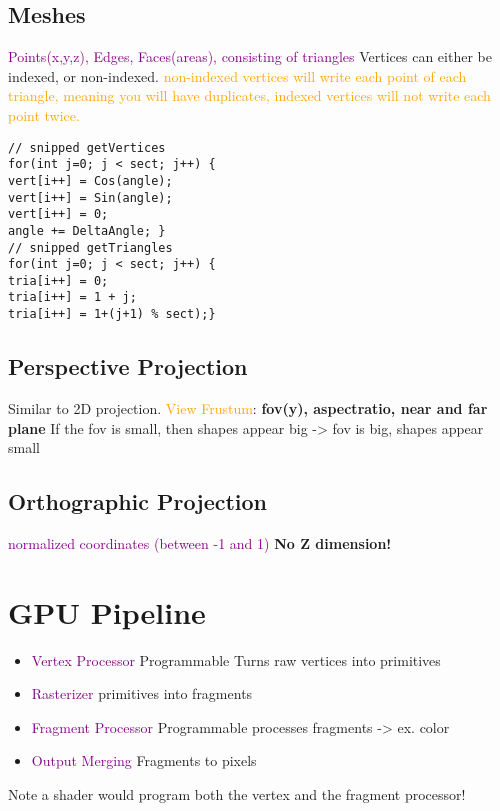 \documentclass[main.tex,fontsize=12pt,paper=a4,paper=landscape,DIV=calc,]{scrartcl}
\begin{document}
\begin{multicols*}{4}
\subsection{Meshes}
\textcolor{purple}{Points(x,y,z), Edges, Faces(areas), consisting of triangles}
Vertices can either be indexed, or non-indexed.\newline
\textcolor{orange}{non-indexed vertices will write each point of each triangle, meaning you will have duplicates, indexed vertices will not write each point twice.}\newline
\begin{lstlisting}
// snipped getVertices
for(int j=0; j < sect; j++) {
vert[i++] = Cos(angle);
vert[i++] = Sin(angle);
vert[i++] = 0;
angle += DeltaAngle; }
// snipped getTriangles
for(int j=0; j < sect; j++) {
tria[i++] = 0;
tria[i++] = 1 + j;
tria[i++] = 1+(j+1) % sect);}
\end{lstlisting}

\subsection{Perspective Projection}
Similar to 2D projection. \newline
\textcolor{orange}{View Frustum}: \newline
\textbf{fov(y), aspectratio, near and far plane}\newline
\textcolor{OliveGreen}{If the fov is small, then shapes appear big -> fov is big, shapes appear small}

\subsection{Orthographic Projection}
\textcolor{purple}{normalized coordinates (between -1 and 1)} \textbf{No Z dimension!}

\section{GPU Pipeline}
\begin{itemize}
\item \textcolor{purple}{Vertex Processor} Programmable\newline
  Turns raw vertices into primitives
\item \textcolor{purple}{Rasterizer} primitives into fragments
\item \textcolor{purple}{Fragment Processor} Programmable \newline
  processes fragments -> ex. color
\item \textcolor{purple}{Output Merging} Fragments to pixels
\end{itemize}
Note a shader would program both the vertex and the fragment processor!


\end{multicols*}
\end{document}
